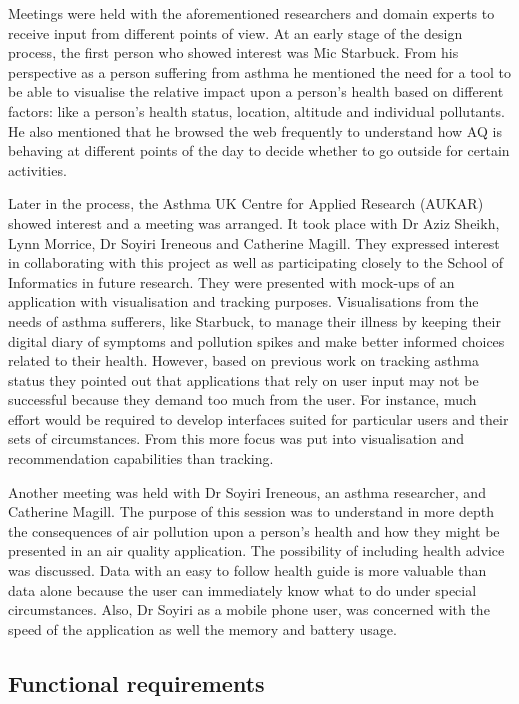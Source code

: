 Meetings were held with the aforementioned researchers and domain experts to receive input from different points of view. At an early stage of the design process, the first person who showed interest was Mic Starbuck. From his perspective as a person suffering from asthma he mentioned the need for a tool to be able to visualise the relative impact upon a person's health based on different factors: like a person's health status, location, altitude and individual pollutants. He also mentioned that he browsed the web frequently to understand how AQ is behaving at different points of the day to decide whether to go outside for certain activities. 

Later in the process, the Asthma UK Centre for Applied Research (AUKAR) showed interest and a meeting was arranged. It took place with Dr Aziz Sheikh, Lynn Morrice, Dr Soyiri Ireneous and Catherine Magill. They expressed interest in collaborating with this project as well as participating closely to the School of Informatics in future research. They were presented with mock-ups of an application with visualisation and tracking purposes. Visualisations from the needs of asthma sufferers, like Starbuck, to manage their illness by keeping their digital diary of symptoms and pollution spikes and make better informed choices related to their health. However, based on previous work on tracking asthma status they pointed out that applications that rely on user input may not be successful because they demand too much from the user. For instance, much effort would be required to develop interfaces suited for particular users and their sets of circumstances. From this more focus was put into visualisation and recommendation capabilities than tracking.

Another meeting was held with Dr Soyiri Ireneous, an asthma researcher, and Catherine Magill. The purpose of this session was to understand in more depth the consequences of air pollution upon a person's health and how they might be presented in an air quality application. The possibility of including health advice was discussed. Data  with an easy to follow health guide is more valuable than data alone because the user can immediately know what to do under special circumstances. Also, Dr Soyiri as a mobile phone user, was concerned with the speed of the application as well the memory and battery usage.

\subsection{Functional requirements}

